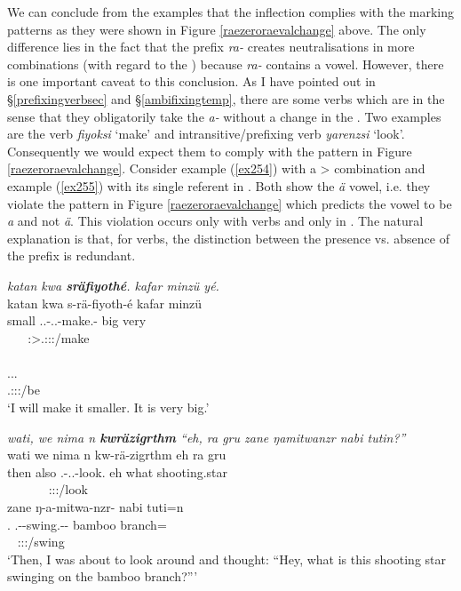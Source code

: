 We can conclude from the examples that the  inflection complies with the  marking patterns as they were shown in Figure \ref{raezeroraevalchange} above. The only difference lies in the fact that the  prefix \emph{ra-} creates neutralisations in more combinations (with regard to the ) because \emph{ra-} contains a vowel. However, there is one important caveat to this conclusion. As I have pointed out in \S{}\ref{prefixingverbsec} and \S{}\ref{ambifixingtemp}, there are some verbs which are  in the sense that they obligatorily take the \emph{a-} without a change in the . Two examples are the  verb \emph{fiyoksi} `make' and intransitive/prefixing verb \emph{yarenzsi} `look'. Consequently we would expect them to comply with the pattern in Figure \ref{raezeroraevalchange}. Consider example (\ref{ex254}) with a \Sg>\Sg{}  combination and example (\ref{ex255}) with its single referent in \Sg{}. Both show the \emph{ä}  vowel, i.e. they violate the pattern in Figure \ref{raezeroraevalchange} which predicts the vowel to be \emph{a} and not \emph{ä}. This violation occurs only with  verbs and only in  . The natural explanation is that, for  verbs, the distinction between the presence vs. absence of the  prefix is redundant.

\begin{exe}
	\ex \emph{katan kwa \textbf{sräfiyothé}. kafar minzü yé.}\\
	\glll katan kwa s-rä-fiyoth-é kafar minzü\\
	small \Fut{} \Tsg.\Masc.\Bet-\Irr.\Ndu.\Vc-make.\Rs-\Fsg{} big very\\
	~ ~ {\Fsg:\Sbj>\Tsg.\Masc:\Obj:\Irr:\Pfv/make} ~ ~\\
	\sn
	\glll {}\\
	\Tsg.\Masc.\Cop.\Ndu\\
	\footnotesize{\Tsg.\Masc:\Sbj:\Nonpast:\Ipfv/be}\\
	\trans `I will make it smaller. It is very big.' 
	\label{ex254}
\end{exe}
\begin{exe}
	\ex \emph{wati, we nima n \textbf{kwräzigrthm} ``eh, ra gru zane ŋamitwanzr nabi tutin?''}\\
	\glll wati we nima n kw-rä-zigrthm eh ra gru\\
	then also \Quot{} \Imn{} \Fsg.\Bet-\Irr.\Ndu.\Vc-look.\Rs{} eh what shooting.star\\
	~ ~ ~ ~ {\Fsg:\Sbj:\Irr:\Pfv/look} ~ ~ ~\\
	\sn
	\glll zane ŋ-a-mitwa-nzr-\Zero{} nabi tuti=n\\
	\Dem.\Prox{} \M.\Alph-\Vc-swing.\Ext-\Ndu-\Stsg{} bamboo branch=\Loc{}\\
	~ {\Stsg:\Sbj:\Nonpast:\Ipfv/swing} ~ ~\\
	\trans `Then, I was about to look around and thought: ``Hey, what is this shooting star swinging on the bamboo branch?''' 
	\label{ex255}
\end{exe}

